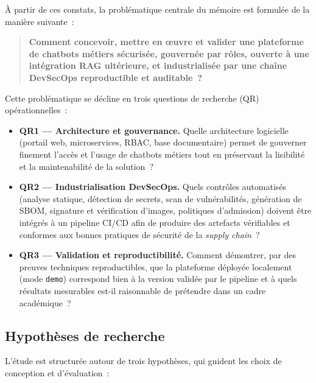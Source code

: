 À partir de ces constats, la problématique centrale du mémoire est formulée de la manière suivante~:

\begin{quote}
\textbf{Comment concevoir, mettre en œuvre et valider une plateforme de chatbots métiers sécurisée, gouvernée par rôles, ouverte à une intégration RAG ultérieure, et industrialisée par une chaîne DevSecOps reproductible et auditable~?}
\end{quote}

Cette problématique se décline en trois questions de recherche (QR) opérationnelles~:

\begin{itemize}
    \item \textbf{QR1 — Architecture et gouvernance.} Quelle architecture logicielle (portail web, microservices, RBAC, base documentaire) permet de gouverner finement l'accès et l'usage de chatbots métiers tout en préservant la lisibilité et la maintenabilité de la solution~?
    \item \textbf{QR2 — Industrialisation DevSecOps.} Quels contrôles automatisés (analyse statique, détection de secrets, scan de vulnérabilités, génération de SBOM, signature et vérification d'images, politiques d'admission) doivent être intégrés à un pipeline CI/CD afin de produire des artefacts vérifiables et conformes aux bonnes pratiques de sécurité de la \textit{supply chain}~?
    \item \textbf{QR3 — Validation et reproductibilité.} Comment démontrer, par des preuves techniques reproductibles, que la plateforme déployée localement (mode \texttt{demo}) correspond bien à la version validée par le pipeline et à quels résultats mesurables est-il raisonnable de prétendre dans un cadre académique~?
\end{itemize}

\subsection{Hypothèses de recherche}

L'étude est structurée autour de trois hypothèses, qui guident les choix de conception et d'évaluation~:

